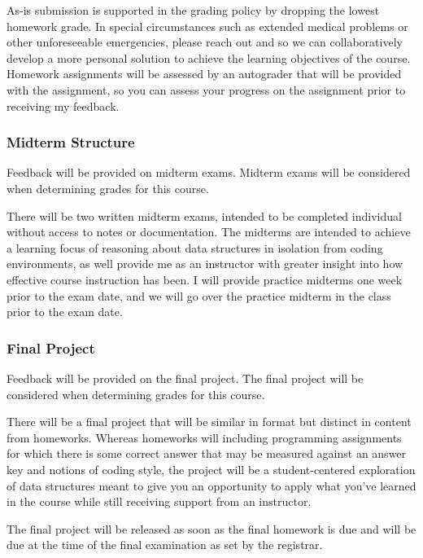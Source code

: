 \documentclass[11pt]{article}
\begin{document}
\bigskip
\noindent As-is submission is supported in the grading policy by dropping the lowest homework
grade. In special circumstances such as extended medical problems or other unforeseeable
emergencies, please reach out and so we can collaboratively develop a more personal
solution to achieve the learning objectives of the course.
\bigskip
\noindent Homework assignments will be assessed by an autograder that will be provided with the assignment, so you can assess your progress on the assignment prior to receiving my feedback.

\subsubsection*{Midterm Structure}

Feedback will be provided on midterm exams.  Midterm exams will be considered when determining grades for this course.

\bigskip
\noindent There will be two written midterm exams, intended to be completed individual
without access to notes or documentation. The midterms are intended to achieve a learning
focus of reasoning about data structures in isolation from coding environments,
as well provide me as an instructor with greater insight into how effective course
instruction has been.
\bigskip
\noindent I will provide practice midterms one week prior to the exam date, and we will go over the practice midterm in the class prior to the exam date.

\subsubsection*{Final Project}

Feedback will be provided on the final project. The final project will be considered when determining grades for this course.

There will be a final project that will be similar in format but distinct in content from
homeworks. Whereas homeworks will including programming assignments for which there is
some correct answer that may be measured against an answer key and notions of coding
style, the project will be a student-centered exploration of data structures meant to
give you an opportunity to apply what you've learned in the course while still receiving
support from an instructor.

\bigskip
\noindent The final project will be released as soon as the final homework is due
 and will be due at the time of the final examination as set 
by the registrar.
\end{document}
